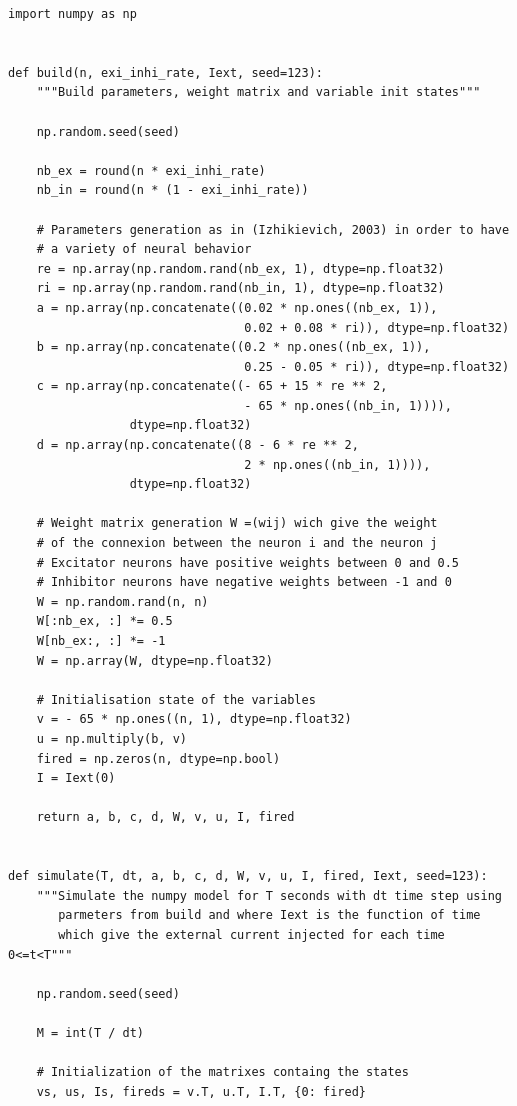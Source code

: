 \documentclass[12pt]{scrartcl}
\begin{document}
\clearpage
\begin{lstlisting}[caption = {Numpy vs Tensorflow : Implémentation Numpy}]
import numpy as np


def build(n, exi_inhi_rate, Iext, seed=123):
    """Build parameters, weight matrix and variable init states"""

    np.random.seed(seed)

    nb_ex = round(n * exi_inhi_rate)
    nb_in = round(n * (1 - exi_inhi_rate))

    # Parameters generation as in (Izhikievich, 2003) in order to have
    # a variety of neural behavior
    re = np.array(np.random.rand(nb_ex, 1), dtype=np.float32)
    ri = np.array(np.random.rand(nb_in, 1), dtype=np.float32)
    a = np.array(np.concatenate((0.02 * np.ones((nb_ex, 1)),
                                 0.02 + 0.08 * ri)), dtype=np.float32)
    b = np.array(np.concatenate((0.2 * np.ones((nb_ex, 1)),
                                 0.25 - 0.05 * ri)), dtype=np.float32)
    c = np.array(np.concatenate((- 65 + 15 * re ** 2,
                                 - 65 * np.ones((nb_in, 1)))),
                 dtype=np.float32)
    d = np.array(np.concatenate((8 - 6 * re ** 2,
                                 2 * np.ones((nb_in, 1)))),
                 dtype=np.float32)

    # Weight matrix generation W =(wij) wich give the weight 
    # of the connexion between the neuron i and the neuron j
    # Excitator neurons have positive weights between 0 and 0.5
    # Inhibitor neurons have negative weights between -1 and 0
    W = np.random.rand(n, n)
    W[:nb_ex, :] *= 0.5
    W[nb_ex:, :] *= -1
    W = np.array(W, dtype=np.float32)

    # Initialisation state of the variables
    v = - 65 * np.ones((n, 1), dtype=np.float32)
    u = np.multiply(b, v)
    fired = np.zeros(n, dtype=np.bool)
    I = Iext(0)

    return a, b, c, d, W, v, u, I, fired


def simulate(T, dt, a, b, c, d, W, v, u, I, fired, Iext, seed=123):
    """Simulate the numpy model for T seconds with dt time step using 
       parmeters from build and where Iext is the function of time 
       which give the external current injected for each time 0<=t<T"""

    np.random.seed(seed)

    M = int(T / dt)

    # Initialization of the matrixes containg the states
    vs, us, Is, fireds = v.T, u.T, I.T, {0: fired}


\end{lstlisting}
\end{document}
